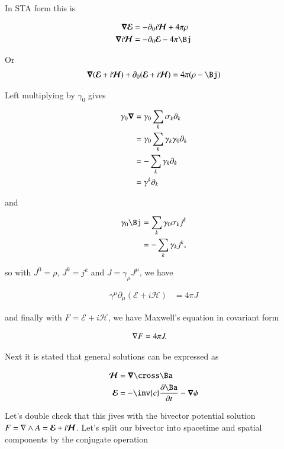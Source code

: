 \documentclass{article}
\newcommand{\EE}[0]{\boldsymbol{\mathcal{E}}}
\newcommand{\HH}[0]{\boldsymbol{\mathcal{H}}}
\begin{document}
In STA form this is

\begin{align*}
\spacegrad \EE &= - \partial_0 i\HH + 4 \pi \rho \\
\spacegrad i\HH &= -\partial_0 \EE - 4 \pi \Bj \\
\end{align*}

Or
\begin{align}\label{eqn:maxwellNotQuiteCovariant}
\spacegrad (\EE + i\HH) + \partial_0 (\EE + i\HH) &= 4 \pi (\rho - \Bj) \\
\end{align}

Left multiplying by $\gamma_0$ gives

\begin{align*}
\gamma_0 \boldsymbol{\nabla} 
&= \gamma_0 \sum_k \sigma_k \partial_k \\
&= \gamma_0 \sum_k \gamma_k \gamma_0 \partial_k \\
&= -\sum_k \gamma_k \partial_k \\
&= \gamma^k \partial_k \\
\end{align*}

and

\begin{align*}
\gamma_0 \Bj 
&= \sum_k \gamma_0 \sigma_k j^k \\
&= -\sum_k \gamma_k j^k,
\end{align*}

so with $J^0 = \rho$, $J^k = j^k$ and $J = \gamma_\mu J^\mu$, we have

\begin{align*}
\gamma^\mu \partial_\mu (\EE + i\HH) &= 4 \pi J
\end{align*}

and finally with $F = \EE + i\HH$, we have Maxwell's equation in covariant form

\begin{align*}
\nabla F &= 4 \pi J.
\end{align*}

Next it is stated that general solutions can be expressed as

\begin{align}\label{eqn:fieldsFromPotentials}
\HH &= \spacegrad \cross \Ba \\
\EE &= - \inv{c} \PD{t}{\Ba} - \spacegrad \phi
\end{align}

Let's double check that this jives with the bivector potential solution $F = \grad \wedge A = \EE + i\HH$.  Let's split our bivector
into spacetime and spatial components by the conjugate operation
\end{document}
